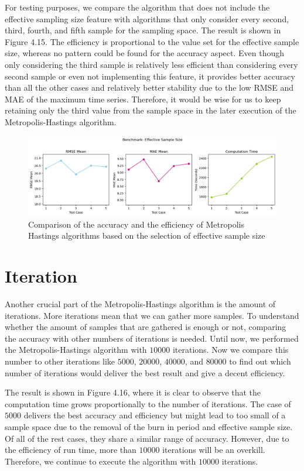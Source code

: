 For testing purposes, we compare the algorithm that does not include the effective sampling size feature with algorithms that only consider every second, third, fourth, and fifth sample for the sampling space. The result is shown in Figure 4.15. The efficiency is proportional to the value set for the effective sample size, whereas no pattern could be found for the accuracy aspect. Even though only considering the third sample is relatively less efficient than considering every second sample or even not implementing this feature, it provides better accuracy than all the other cases and relatively better stability due to the low RMSE and MAE of the maximum time series. Therefore, it would be wise for us to keep retaining only the third value from the sample space in the later execution of the Metropolis-Hastings algorithm.

\begin{figure}[H]
    \centering
    \includegraphics[width=1\textwidth]{figures/basic_mh/benchmark/effective_sample_size.png}
    \captionsetup{width=.8\textwidth}
    \caption{Comparison of the accuracy and the efficiency of Metropolis Hastings algorithms based on the selection of effective sample size}
    \label{fig:enter-label}
\end{figure}


\section{Iteration}
Another crucial part of the Metropolis-Hastings algorithm is the amount of iterations. More iterations mean that we can gather more samples. To understand whether the amount of samples that are gathered is enough or not, comparing the accuracy with other numbers of iterations is needed. Until now, we performed the Metropolis-Hastings algorithm with $10000$ iterations. Now we compare this number to other iterations like $5000$, $20000$, $40000$, and $80000$ to find out which number of iterations would deliver the best result and give a decent efficiency.

The result is shown in Figure 4.16, where it is clear to observe that the computation time grows proportionally to the number of iterations. The case of $5000$ delivers the best accuracy and efficiency but might lead to too small of a sample space due to the removal of the burn in period and effective sample size. Of all of the rest cases, they share a similar range of accuracy. However, due to the efficiency of run time, more than $10000$ iterations will be an overkill. Therefore, we continue to execute the algorithm with $10000$ iterations. 

